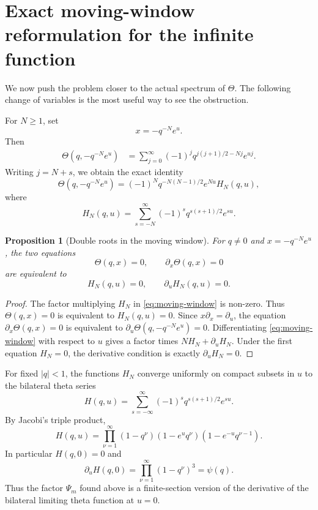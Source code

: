 \documentclass[11pt,a4paper,reqno]{amsart}
\newtheorem{proposition}[theorem]{Proposition}
\theoremstyle{remark}
\begin{document}
\section{Exact moving-window reformulation for the infinite function}
We now push the problem closer to the actual spectrum of \(\Theta\).  The following change of variables is the most useful way to see the obstruction.

For \(N\ge1\), set
\[
        x=-q^{-N}e^u.
\]
Then
\begin{align*}
\Theta(q,-q^{-N}e^u)
&=\sum_{j=0}^{\infty}(-1)^j q^{j(j+1)/2-Nj}e^{uj}.
\end{align*}
Writing \(j=N+s\), we obtain the exact identity
\begin{equation}\label{eq:moving-window}
        \Theta(q,-q^{-N}e^u)
        =(-1)^Nq^{-N(N-1)/2}e^{Nu}H_N(q,u),
\end{equation}
where
\begin{equation}\label{eq:HN-def}
        H_N(q,u)=\sum_{s=-N}^{\infty}(-1)^s q^{s(s+1)/2}e^{su}.
\end{equation}

\begin{proposition}[Double roots in the moving window]\label{prop:moving-window-double}
For \(q\ne0\) and \(x=-q^{-N}e^u\), the two equations
\[
        \Theta(q,x)=0,
        \qquad
        \partial_x\Theta(q,x)=0
\]
are equivalent to
\[
        H_N(q,u)=0,
        \qquad
        \partial_uH_N(q,u)=0.
\]
\end{proposition}

\begin{proof}
The factor multiplying \(H_N\) in \eqref{eq:moving-window} is non-zero.  Thus \(\Theta(q,x)=0\) is equivalent to \(H_N(q,u)=0\).  Since \(x\partial_x=\partial_u\), the equation \(\partial_x\Theta(q,x)=0\) is equivalent to \(\partial_u\Theta(q,-q^{-N}e^u)=0\).  Differentiating \eqref{eq:moving-window} with respect to \(u\) gives a factor times \(NH_N+\partial_uH_N\).  Under the first equation \(H_N=0\), the derivative condition is exactly \(\partial_uH_N=0\).
\end{proof}

For fixed \(|q|<1\), the functions \(H_N\) converge uniformly on compact subsets in \(u\) to the bilateral theta series
\[
        H(q,u)=\sum_{s=-\infty}^{\infty}(-1)^s q^{s(s+1)/2}e^{su}.
\]
By Jacobi's triple product,
\begin{equation}\label{eq:bilateral-product}
        H(q,u)=\prod_{\nu=1}^{\infty}(1-q^\nu)(1-e^u q^\nu)(1-e^{-u}q^{\nu-1}).
\end{equation}
In particular \(H(q,0)=0\) and
\[
        \partial_uH(q,0)=\prod_{\nu=1}^{\infty}(1-q^\nu)^3=\psi(q).
\]
Thus the factor \(\Psi_m\) found above is a finite-section version of the derivative of the bilateral limiting theta function at \(u=0\).
\end{document}

